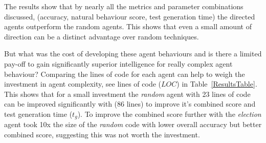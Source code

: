 \documentclass[letterpaper, 10 pt, journal, twoside]{IEEEtran}
\begin{document}



The results show that by nearly all the metrics and parameter combinations discussed, (accuracy, natural behaviour score, test generation time) the directed agents outperform the random agents. This shows that even a small amount of direction can be a distinct advantage over random techniques. 
%

But what was the cost of developing these agent behaviours and is there a limited pay-off to gain significantly superior intelligence for really complex agent behaviour? %
%
Comparing the lines of code for each agent can help to weigh the investment in agent complexity, see lines of code ($LOC$) in Table~\ref{ResultsTable}. This shows that for a small investment the \textit{random} agent with 23 lines of code can be improved significantly with (86 lines) to improve it's combined score and test generation time ($t_{g}$). To improve the combined score further with the \textit{election} agent took 10x the size of the \textit{random} code with lower overall accuracy but better combined score, suggesting this was not worth the investment.
\end{document}
